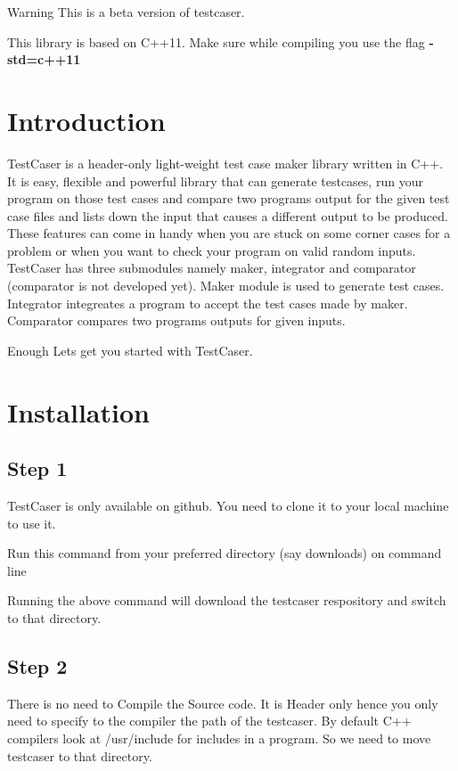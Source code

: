 \begin{DoxyWarning}{Warning}
This is a beta version of testcaser.

This library is based on C++11. Make sure while compiling you use the flag {\bfseries{-\/std=c++11}}
\end{DoxyWarning}
\hypertarget{index_sec_intro}{}\section{Introduction}\label{index_sec_intro}
Test\+Caser is a header-\/only light-\/weight test case maker library written in C++. It is easy, flexible and powerful library that can generate testcases, run your program on those test cases and compare two program\textquotesingle{}s output for the given test case files and lists down the input that causes a different output to be produced. These features can come in handy when you are stuck on some corner cases for a problem or when you want to check your program on valid random inputs. Test\+Caser has three submodules namely maker, integrator and comparator (comparator is not developed yet). Maker module is used to generate test cases. Integrator integreates a program to accept the test cases made by maker. Comparator compares two program\textquotesingle{}s outputs for given inputs.

Enough Let\textquotesingle{}s get you started with Test\+Caser. 

\hypertarget{index_sec_install}{}\section{Installation}\label{index_sec_install}
\hypertarget{index_step1}{}\subsection{Step 1}\label{index_step1}
Test\+Caser is only available on github. You need to clone it to your local machine to use it.

Run this command from your preferred directory (say downloads) on command line 
\begin{DoxyCode}{0}
\end{DoxyCode}
 Running the above command will download the testcaser respository and switch to that directory.\hypertarget{index_step2}{}\subsection{Step 2}\label{index_step2}
There is no need to Compile the Source code. It is Header only hence you only need to specify to the compiler the path of the testcaser. By default C++ compilers look at {\ttfamily /usr/include} for includes in a program. So we need to move testcaser to that directory.


